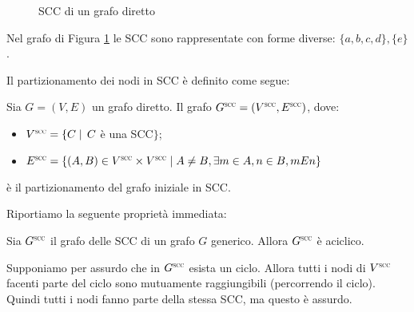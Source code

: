 \begin{example}
    \begin{figure}[t]
        \centering
        \caption{SCC di un grafo diretto}
        \label{fig:graph_cfc_1}
    \end{figure}
    Nel grafo di Figura \ref{fig:graph_cfc_1} le SCC sono rappresentate con forme diverse: $\{a,b,c,d\}, \{e\}$.
\end{example}
Il partizionamento dei nodi in SCC è definito come segue:
\begin{definition} \label{def:scc_partition}
    Sia $G = (V, E)$ un grafo diretto. Il grafo $G^{\superscc} = (V^{\superscc}, E^{\superscc})$, dove:
    \begin{itemize}
        \item $V^{\superscc} = \{C \mid \,C$ è una SCC$\}$;
        \item $E^{\superscc} = \{(A,B) \in V^{\superscc} \times V^{\superscc} \mid A \neq B, \exists m \in A, n \in B, m E n\}$
    \end{itemize}
    è il partizionamento del grafo iniziale in SCC.
\end{definition}
Riportiamo la seguente proprietà immediata:
\begin{proposition}
    Sia $G^{\superscc}$ il grafo delle SCC di un grafo $G$ generico. Allora $G^{\superscc}$ è aciclico.
\end{proposition}
\begin{proof2}
    Supponiamo per assurdo che in $G^{\superscc}$ esista un ciclo. Allora tutti i nodi di $V^{\superscc}$ facenti parte del ciclo sono mutuamente raggiungibili (percorrendo il ciclo). Quindi tutti i nodi fanno parte della stessa SCC, ma questo è assurdo.
\end{proof2}
